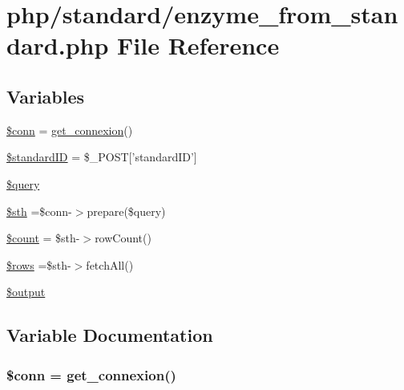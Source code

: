 \hypertarget{standard_2enzyme__from__standard_8php}{\section{php/standard/enzyme\-\_\-from\-\_\-standard.php File Reference}
\label{standard_2enzyme__from__standard_8php}
}
\subsection*{Variables}
\begin{DoxyCompactItemize}
\item 
\hyperlink{standard_2enzyme__from__standard_8php_aa8a5a87b9c1a6a0819b88447cbe41877}{\$conn} = \hyperlink{php__functions_8php_ace18bc10f3fd08f92688ac743e0d8c2e}{get\-\_\-connexion}()
\item 
\hyperlink{standard_2enzyme__from__standard_8php_a0c541a369e4a0434108a7d145751bb23}{\$standard\-I\-D} = \$\-\_\-\-P\-O\-S\-T\mbox{[}'standard\-I\-D'\mbox{]}
\item 
\hyperlink{standard_2enzyme__from__standard_8php_af59a5f7cd609e592c41dc3643efd3c98}{\$query}
\item 
\hyperlink{standard_2enzyme__from__standard_8php_afa9126f9664959c02795be300a135f93}{\$sth} =\$conn-\/$>$prepare(\$query)
\item 
\hyperlink{standard_2enzyme__from__standard_8php_af789423037bbc89dc7c850e761177570}{\$count} = \$sth-\/$>$row\-Count()
\item 
\hyperlink{standard_2enzyme__from__standard_8php_ace2ec39e7df3899fa8df9640ec274b03}{\$rows} =\$sth-\/$>$fetch\-All()
\item 
\hyperlink{standard_2enzyme__from__standard_8php_a73004ce9cd673c1bfafd1dc351134797}{\$output}
\end{DoxyCompactItemize}


\subsection{Variable Documentation}
\hypertarget{standard_2enzyme__from__standard_8php_aa8a5a87b9c1a6a0819b88447cbe41877}{
\subsubsection[{\$conn}]{\setlength{\rightskip}{0pt plus 5cm}\$conn = {\bf get\-\_\-connexion}()}}\label{standard_2enzyme__from__standard_8php_aa8a5a87b9c1a6a0819b88447cbe41877}


